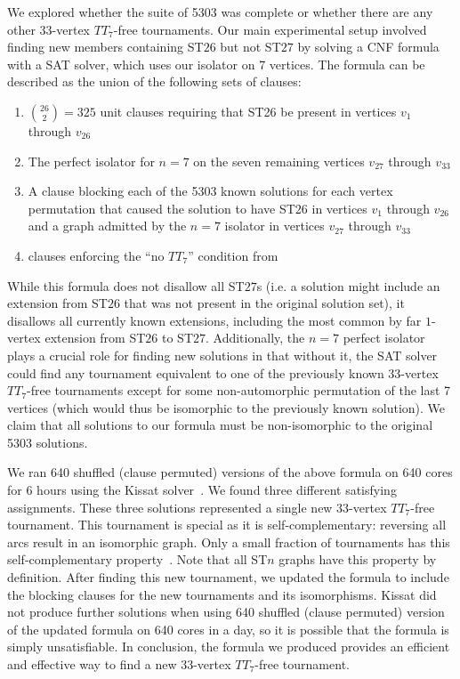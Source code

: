\documentclass[conference]{IEEEtran}
\begin{document}
We explored whether the suite of 5303 was complete or whether there are any other 33-vertex $TT_7$-free tournaments.
 Our main experimental setup involved finding new members containing ST$26$ but not ST$27$ by solving a CNF formula with a SAT solver, which uses our isolator on 7 vertices. The formula can be described as the union of the following sets of clauses:
 
 \begin{enumerate}
 \item ${26 \choose 2} = 325$ unit clauses requiring that ST26 be present in vertices $v_1$ through $v_{26}$
 \item The perfect isolator for $n=7$ on the seven remaining vertices $v_{27}$ through $v_{33}$
 \item A clause blocking each of the 5303 known solutions for each vertex permutation that caused the solution to have ST$26$ in vertices $v_1$ through $v_{26}$ and a graph admitted by the $n=7$ isolator in vertices $v_{27}$ through $v_{33}$
 \item clauses enforcing the ``no $TT_7$'' condition from \cite{directedramsey}
 \end{enumerate}

While this formula does not disallow all ST$27$s (i.e. a solution might include an extension from ST$26$ that was not present in the original solution set), it disallows all currently known extensions, including the most common by far $1$-vertex extension from ST$26$ to ST$27$. Additionally, the $n=7$ perfect isolator plays a crucial role for finding new solutions in that without it, the SAT solver could find any tournament equivalent to one of the previously known 33-vertex $TT_7$-free tournaments  except for some non-automorphic permutation of the last 7 vertices (which would thus be isomorphic to the previously known solution). We claim that all solutions to our formula must be non-isomorphic to the original 5303 solutions. 

We ran 640 shuffled (clause permuted) versions of the above formula on 640 cores for 6 hours using the Kissat solver~\cite{Kissat}. We found three different satisfying assignments. These three solutions represented  a single new 33-vertex $TT_7$-free tournament. This tournament is special as it is self-complementary: reversing all arcs result in an isomorphic graph. Only a small fraction of tournaments has this self-complementary property~\cite{Eplett}. Note that all ST$n$ graphs have this property by definition. After finding this new tournament, we updated the formula to include the blocking clauses for the new tournaments and its isomorphisms. Kissat did not produce further solutions when using 640 shuffled (clause permuted) version of the updated formula on 640 cores in a day, so it is possible that the formula is simply unsatisfiable. In conclusion, the formula we produced provides an efficient and effective way to find a new 33-vertex $TT_7$-free tournament. 
\end{document}
